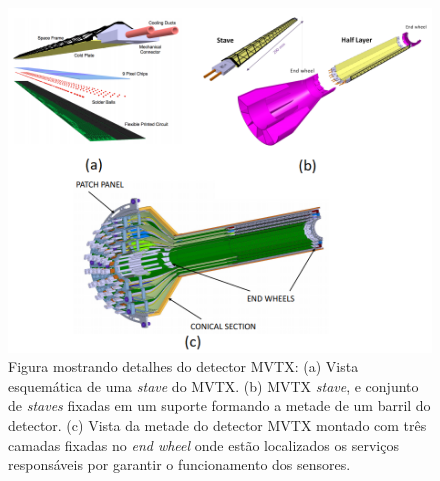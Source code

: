 \begin{figure} 
    \centering
    \includegraphics[width=16.0cm]{assets/mvtx_detail.JPG}
    \caption{Figura mostrando detalhes do detector MVTX: (a) Vista esquemática de uma \textit{stave} do MVTX. (b) MVTX \textit{stave}, e conjunto de \textit{staves} fixadas em um suporte formando a metade de um barril do detector. (c) Vista da metade do detector MVTX montado com três camadas fixadas no \textit{end wheel} onde estão localizados os serviços responsáveis por garantir o funcionamento dos sensores.}
    \label{mvtxdetail}
\end{figure}

\renewcommand{\cleardoublepage}{}
\renewcommand{\clearpage}{}